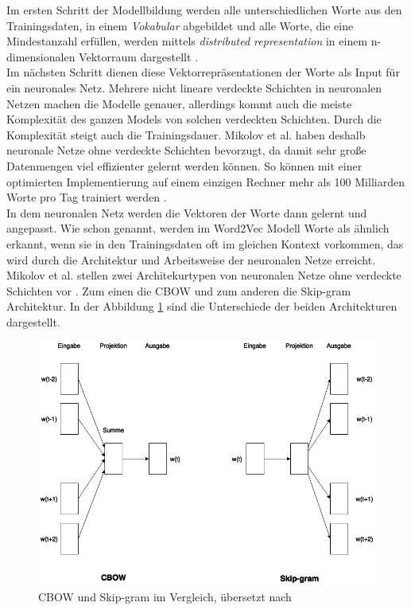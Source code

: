 \documentclass[12pt,a4paper]{report}
\begin{document}
Im ersten Schritt der Modellbildung werden alle unterschiedlichen Worte aus den Trainingsdaten, in einem \textit{Vokabular} abgebildet und alle Worte, die eine Mindestanzahl erfüllen, werden mittels \textit{distributed representation} in einem n-dimensionalen Vektorraum dargestellt \cite{DBLP:journals/corr/abs-1301-3781}.\\ 
Im nächsten Schritt dienen diese Vektorrepräsentationen der Worte als Input für ein  neuronales Netz. Mehrere nicht lineare verdeckte Schichten in neuronalen Netzen machen die Modelle genauer, allerdings kommt auch die meiste Komplexität des ganzen Models von solchen verdeckten Schichten. Durch die Komplexität steigt auch die Trainingsdauer. Mikolov et al. \citep{DBLP:journals/corr/abs-1301-3781} haben deshalb neuronale Netze ohne verdeckte Schichten bevorzugt, da damit sehr große Datenmengen viel effizienter gelernt werden können. So können mit einer optimierten Implementierung auf einem einzigen Rechner mehr als 100 Milliarden Worte pro Tag trainiert werden \cite{DBLP:journals/corr/MikolovSCCD13}. \\
In dem neuronalen Netz werden die Vektoren der Worte dann gelernt und angepasst. Wie schon genannt, werden im Word2Vec Modell Worte als ähnlich erkannt, wenn sie in den Trainingsdaten oft im gleichen Kontext vorkommen, das wird durch die Architektur und Arbeitsweise der neuronalen Netze erreicht. Mikolov et al. stellen zwei Architekurtypen von neuronalen Netze ohne verdeckte Schichten vor \citep{DBLP:journals/corr/abs-1301-3781}. Zum einen die CBOW und zum anderen die Skip-gram Architektur. In der Abbildung \ref{cbowvsskipgram} sind die Unterschiede der beiden Architekturen dargestellt.\\


\begin{figure}[h]
  \begin{center}
	\includegraphics[scale=0.55]{CBOWvsSkip-gram.png}
  \end{center}  
  \caption{CBOW und Skip-gram im Vergleich, übersetzt nach \cite{DBLP:journals/corr/abs-1301-3781}}
  \label{cbowvsskipgram}
\end{figure}
\end{document}
